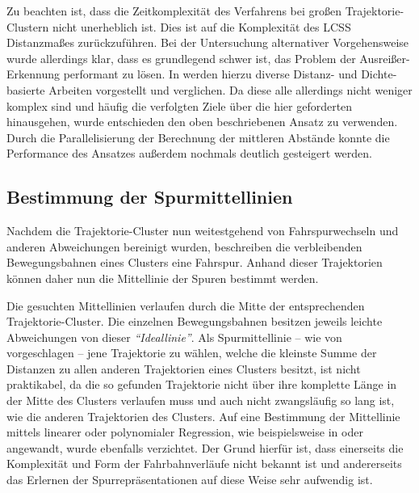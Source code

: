 Zu beachten ist, dass die Zeitkomplexität des Verfahrens bei großen Trajektorie-Clustern
nicht unerheblich ist. Dies ist auf die Komplexität des LCSS Distanzmaßes zurückzuführen.
Bei der Untersuchung alternativer Vorgehensweise wurde allerdings klar, dass es grundlegend schwer ist,
das Problem der Ausreißer-Erkennung performant zu lösen.
In \cite[]{Meng2018} werden hierzu diverse Distanz- und Dichte-basierte
Arbeiten vorgestellt und verglichen. Da diese alle allerdings nicht weniger komplex sind und häufig
die verfolgten Ziele über die hier geforderten hinausgehen, wurde entschieden den oben beschriebenen Ansatz
zu verwenden. Durch die Parallelisierung der Berechnung der mittleren Abstände konnte die Performance
des Ansatzes außerdem nochmals deutlich gesteigert werden.

\subsection{Bestimmung der Spurmittellinien}
\label{sec:real2_define_lane_centerline}

Nachdem die Trajektorie-Cluster nun weitestgehend von Fahrspurwechseln und anderen Abweichungen bereinigt
wurden, beschreiben die verbleibenden Bewegungsbahnen eines Clusters eine Fahrspur.
Anhand dieser Trajektorien können daher nun die Mittellinie der Spuren bestimmt werden.

Die gesuchten Mittellinien verlaufen durch die Mitte der entsprechenden
Trajektorie-Cluster. Die einzelnen Bewegungsbahnen besitzen jeweils leichte Abweichungen von dieser \textit{``Ideallinie''}.
Als Spurmittellinie -- wie von \cite[]{Hu2005} vorgeschlagen -- jene Trajektorie zu wählen, welche die
kleinste Summe der Distanzen zu allen anderen Trajektorien eines Clusters besitzt, ist nicht praktikabel,
da die so gefunden Trajektorie nicht über ihre komplette Länge in der Mitte des Clusters verlaufen muss
und auch nicht zwangsläufig so lang ist, wie die anderen Trajektorien des Clusters.
Auf eine Bestimmung der Mittellinie mittels linearer oder polynomialer Regression, wie beispielsweise in
\cite[]{Chen2014} oder \cite[]{Melo2006} angewandt,
wurde ebenfalls verzichtet. Der Grund hierfür ist, dass einerseits die Komplexität und Form der Fahrbahnverläufe
nicht bekannt ist und andererseits das Erlernen der Spurrepräsentationen auf diese Weise sehr aufwendig ist.

